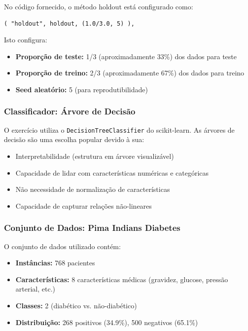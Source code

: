 \documentclass[12pt,a4paper]{article}
\begin{document}
No código fornecido, o método holdout está configurado como:
\begin{lstlisting}
( "holdout", holdout, (1.0/3.0, 5) ),
\end{lstlisting}

Isto configura:
\begin{itemize}
    \item \textbf{Proporção de teste:} 1/3 (aproximadamente 33\%) dos dados para teste
    \item \textbf{Proporção de treino:} 2/3 (aproximadamente 67\%) dos dados para treino
    \item \textbf{Seed aleatório:} 5 (para reprodutibilidade)
\end{itemize}

\subsubsection{Classificador: Árvore de Decisão}

O exercício utiliza o \texttt{DecisionTreeClassifier} do scikit-learn. As árvores de decisão são uma escolha popular devido à sua:
\begin{itemize}
    \item Interpretabilidade (estrutura em árvore visualizável)
    \item Capacidade de lidar com características numéricas e categóricas
    \item Não necessidade de normalização de características
    \item Capacidade de capturar relações não-lineares
\end{itemize}

\subsubsection{Conjunto de Dados: Pima Indians Diabetes}

O conjunto de dados utilizado contém:
\begin{itemize}
    \item \textbf{Instâncias:} 768 pacientes
    \item \textbf{Características:} 8 características médicas (gravidez, glucose, pressão arterial, etc.)
    \item \textbf{Classes:} 2 (diabético vs. não-diabético)
    \item \textbf{Distribuição:} 268 positivos (34.9\%), 500 negativos (65.1\%)
\end{itemize}
\end{document}
